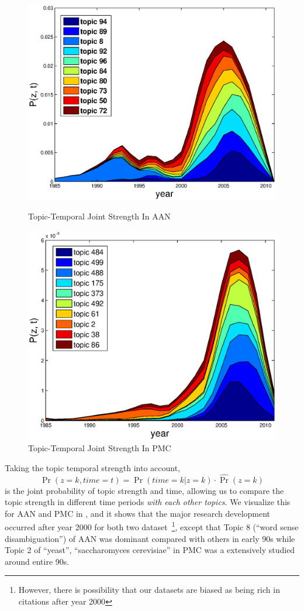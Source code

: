 \begin{figure}[h!]
  \centering
  \includegraphics[scale=0.60
    ]{citation-lda/plot/AAN_10_temporal_stack_joint_smooth.eps}
  \caption{Topic-Temporal Joint Strength In AAN}\label{fig:tt_aan}
  \includegraphics[scale=0.60
    ]{citation-lda/plot/PMC_10_temporal_stack_joint_smooth.eps}
  \caption{Topic-Temporal Joint Strength In PMC}\label{fig:tt_pmc}
\end{figure}

Taking the topic temporal strength into account,  $$\Pr(z=k,time=t) = \Pr(time =
k | z = k) \cdot \hat\Pr(z = k)$$ is the joint probability of topic strength and
time, allowing us to compare the topic strength in different time periods
\emph{with each other topics}. We visualize this for AAN and PMC in
, and it shows that the major research development
occurred after year 2000 for both two dataset~\footnote{However, there is
  possibility that our datasets are biased as being rich in citations after year
2000}, except that Topic 8 (``word sense disambiguation'') of AAN was dominant
compared with others in early 90s while Topic 2 of ``yeast'', ``saccharomyces
cerevisiae'' in PMC was a extensively studied around entire 90s.

